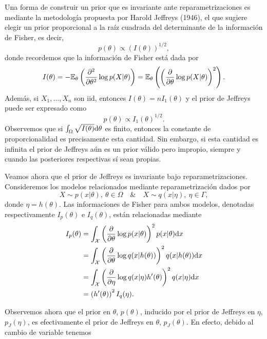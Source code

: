 Una forma de construir un prior que es invariante ante reparametrizaciones es mediante la metodología propuesta por  Harold Jeffreys (1946), el que sugiere elegir un prior proporcional a la raíz cuadrada del determinante de la información de Fisher, es decir,  
\begin{equation}
	p(\theta) \propto \left( I(\theta)\right)^{1/2},
\end{equation}
donde recordemos que la información de Fisher está dada por 
\begin{equation}
	I(\theta) = -\mathbb{E}_\theta \left(\frac{\partial^2}{\partial\theta^2}\log p(X|\theta)\right) = \mathbb{E}_\theta \left(\left(\frac{\partial}{\partial\theta}\log p(X|\theta)\right)^2\right).
\end{equation}
Además, si $X_1,\ldots,X_n$ son iid, entonces $I(\theta) = n I_1(\theta)$ y el prior de Jeffreys puede ser expresado como 
\begin{equation}
	p(\theta) \propto  I_1(\theta)^{1/2}.
\end{equation}
Observemos que si $\int_\Omega\sqrt{I(\theta)}{\text{d}}\theta$ es finito, entonces la constante de proporcionalidad es precisamente esta cantidad. Sin embargo, si esta cantidad es infinita el prior de Jeffreys aún es un prior válido pero impropio, siempre y cuando las posteriores respectivas sí sean propias. 

Veamos ahora que el prior de Jeffreys es invariante bajo reparametrizaciones. Consideremos los modelos relacionados mediante reparametrización dados por 
\begin{equation}
	X\sim p(x|\theta),\ \theta\in\Omega\quad \& \quad X\sim q(x|\eta),\ \eta\in\Gamma,
\end{equation}
donde $\eta = h(\theta)$. Las informaciones de Fisher para ambos modelos, denotadas respectivamente $I_p(\theta)$ e $I_q(\theta)$, están relacionadas mediante
\begin{align}
	I_p(\theta) &= \int_{\mathcal X}\left(\frac{\partial}{\partial\theta}\log p(x|\theta)\right)^2p(x|\theta){\text{d}} x\nonumber\\
				&= \int_{\mathcal X}\left(\frac{\partial}{\partial\theta}\log q(x|h(\theta))\right)^2q(x|h(\theta)){\text{d}} x\nonumber\\
				&= \int_{\mathcal X}\left(\frac{\partial}{\partial\eta}\log q(x|\eta) h'(\theta)\right)^2q(x|\eta){\text{d}} x\nonumber\\
				&= \left(h'(\theta)\right)^2 I_q(\eta).
\end{align} 

Observemos ahora que el prior en $\theta$, $p(\theta)$, inducido por el prior de Jeffreys en $\eta$, $p_J(\eta)$, es efectivamente el prior de Jeffreys en $\theta$, $p_J(\theta)$. En efecto, debido al cambio de variable tenemos

